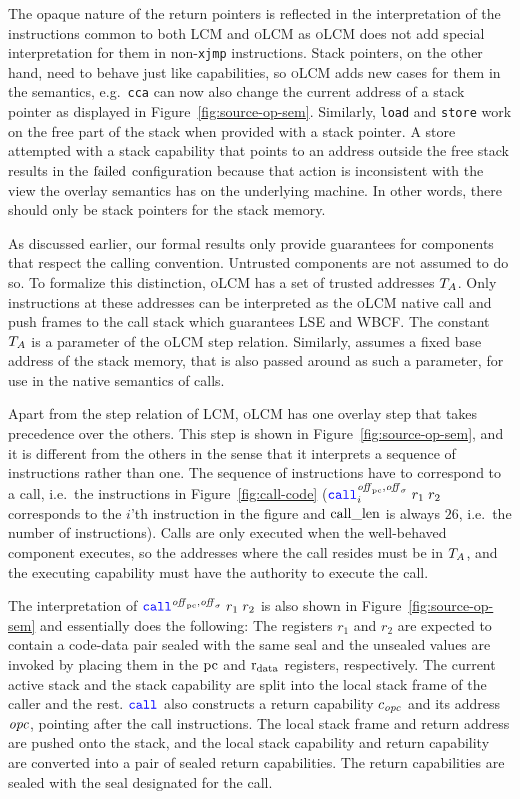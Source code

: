 \documentclass{jfp}
\newcommand{\trgcm}{\textsc{LCM}}
\newcommand{\srccm}{\textsc{oLCM}}
\begin{document}
The opaque nature of the return pointers is reflected in the interpretation of the instructions common to both \trgcm{} and \srccm{} as \srccm{} does not add special interpretation for them in non-\texttt{xjmp} instructions.
Stack pointers, on the other hand, need to behave just like capabilities, so \srccm{} adds new cases for them in the semantics, e.g.\ \texttt{cca} can now also change the current address of a stack pointer as displayed in Figure~\ref{fig:source-op-sem}.
Similarly, \texttt{load} and \texttt{store} work on the free part of the stack when provided with a stack pointer.
A store attempted with a stack capability that points to an address outside the free stack results in the $\mathrm{failed}$ configuration because that action is inconsistent with the view the overlay semantics has on the underlying machine.
In other words, there should only be stack pointers for the stack memory.

As discussed earlier, our formal results only provide guarantees for components that respect the calling convention.
Untrusted components are not assumed to do so.
To formalize this distinction, \srccm{} has a set of trusted addresses $T_{A}$.
Only instructions at these addresses can be interpreted as the \srccm{} native call and push frames to the call stack which guarantees LSE and WBCF.
The constant $T_{A}$ is a parameter of the \srccm{} step relation.
Similarly, \stktokens{} assumes a fixed base address of the stack memory, that is also passed around as such a parameter, for use in the native semantics of calls.

Apart from the step relation of \trgcm{}, \srccm{} has one overlay step that takes precedence over the others.
This step is shown in Figure~\ref{fig:source-op-sem}, and it is different from the others in the sense that it interprets a sequence of instructions rather than one.
The sequence of instructions have to correspond to a call, i.e.\ the
instructions in Figure~\ref{fig:call-code} ({\footnotesize  $\scall[i]{\offpc,\offsigma}{r_1}{r_2}$} corresponds to the $i$'th instruction in the figure and $\mathrm{call\_len}$ is always $26$, i.e.\ the number of instructions).
Calls are only executed when the well-behaved component executes, so the addresses where the call resides must be in $T_{A}$, and the executing capability must have the authority to execute the call.

The interpretation of $\scall{\offpc,\offsigma}{r_1}{r_2}$ is also shown in Figure~\ref{fig:source-op-sem} and essentially does the following:
The registers $r_1$ and $r_2$ are expected to contain a code-data pair sealed with the same seal and the unsealed values are invoked by placing them in the $\mathrm{pc}$ and $\mathrm{r}_\mathrm{data}$ registers, respectively.
The current active stack and the stack capability are split into the local stack frame of the caller and the rest.
$\scall{}{}{}$ also constructs a return capability $c_{\mathit{opc}}$ and its address $\mathit{opc}$, pointing after the call instructions.
The local stack frame and return address are pushed onto the stack, and the local stack capability and return capability are converted into a pair of sealed return capabilities.
The return capabilities are sealed with the seal designated for the call.
\end{document}
